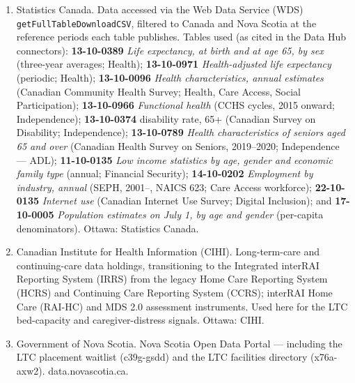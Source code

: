 \documentclass[
  11pt,
]{article}
\providecommand{\tightlist}{%
  \setlength{\itemsep}{0pt}\setlength{\parskip}{0pt}}
\begin{document}
\begin{enumerate}
\def\labelenumi{\arabic{enumi}.}
\setcounter{enumi}{11}
\tightlist
\item
  Statistics Canada. Data accessed via the Web Data Service (WDS)
  \texttt{getFullTableDownloadCSV}, filtered to Canada and Nova Scotia
  at the reference periods each table publishes. Tables used (as cited
  in the Data Hub connectors): \textbf{13-10-0389} \emph{Life
  expectancy, at birth and at age 65, by sex} (three-year averages;
  Health); \textbf{13-10-0971} \emph{Health-adjusted life expectancy}
  (periodic; Health); \textbf{13-10-0096} \emph{Health characteristics,
  annual estimates} (Canadian Community Health Survey; Health, Care
  Access, Social Participation); \textbf{13-10-0966} \emph{Functional
  health} (CCHS cycles, 2015 onward; Independence); \textbf{13-10-0374}
  disability rate, 65+ (Canadian Survey on Disability; Independence);
  \textbf{13-10-0789} \emph{Health characteristics of seniors aged 65
  and over} (Canadian Health Survey on Seniors, 2019--2020; Independence
  --- ADL); \textbf{11-10-0135} \emph{Low income statistics by age,
  gender and economic family type} (annual; Financial Security);
  \textbf{14-10-0202} \emph{Employment by industry, annual} (SEPH,
  2001--, NAICS 623; Care Access workforce); \textbf{22-10-0135}
  \emph{Internet use} (Canadian Internet Use Survey; Digital Inclusion);
  and \textbf{17-10-0005} \emph{Population estimates on July 1, by age
  and gender} (per-capita denominators). Ottawa: Statistics Canada.
\item
  Canadian Institute for Health Information (CIHI). Long-term-care and
  continuing-care data holdings, transitioning to the Integrated
  interRAI Reporting System (IRRS) from the legacy Home Care Reporting
  System (HCRS) and Continuing Care Reporting System (CCRS); interRAI
  Home Care (RAI-HC) and MDS 2.0 assessment instruments. Used here for
  the LTC bed-capacity and caregiver-distress signals. Ottawa: CIHI.
\item
  Government of Nova Scotia. Nova Scotia Open Data Portal --- including
  the LTC placement waitlist (c39g-gsdd) and the LTC facilities
  directory (x76a-axw2). data.novascotia.ca.
\end{enumerate}
\end{document}
